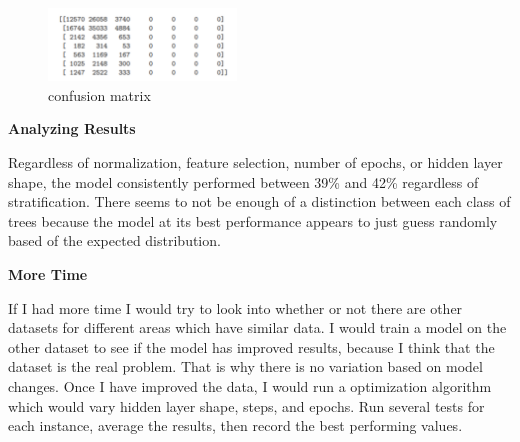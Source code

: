 \documentclass[conference]{IEEEtran}
\begin{document}
\begin{figure}[htbp]
\centerline{\includegraphics[width=50mm,scale=0.5]{imgs/conf_matrix}}
\caption{confusion matrix}
\label{fig}
\end{figure}

\noindent \textbf{Analyzing Results}

\noindent  Regardless of normalization, feature selection, number of epochs, or hidden layer shape, the model consistently performed between 39\% and 42\% regardless of stratification. There seems to not be enough of a distinction between each class of trees because the model at its best performance appears to just guess randomly based of the expected distribution. 

\noindent \textbf{More Time}

\noindent If I had more time I would try to look into whether or not there are other datasets for different areas which have similar data. I would train a model on the other dataset to see if the model has improved results, because I think that the dataset is the real problem. That is why there is no variation based on model changes. Once I have improved the data, I would run a optimization algorithm which would vary hidden layer shape, steps, and epochs. Run several tests for each instance, average the results, then record the best performing values.
\end{document}
